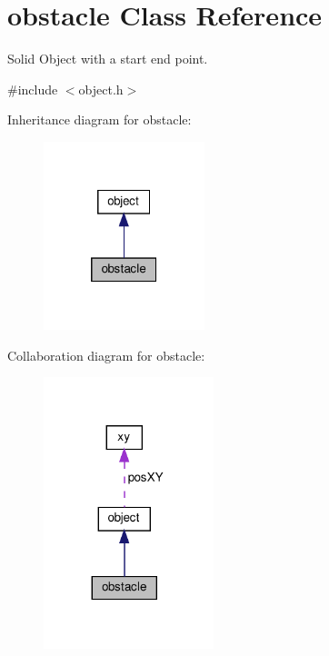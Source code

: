 \hypertarget{classobstacle}{}\section{obstacle Class Reference}
\label{classobstacle}


Solid Object with a start end point.  




{\ttfamily \#include $<$object.\+h$>$}



Inheritance diagram for obstacle\+:
\nopagebreak
\begin{figure}[H]
\begin{center}
\leavevmode
\includegraphics[width=133pt]{classobstacle__inherit__graph}
\end{center}
\end{figure}


Collaboration diagram for obstacle\+:
\nopagebreak
\begin{figure}[H]
\begin{center}
\leavevmode
\includegraphics[width=140pt]{classobstacle__coll__graph}
\end{center}
\end{figure}
